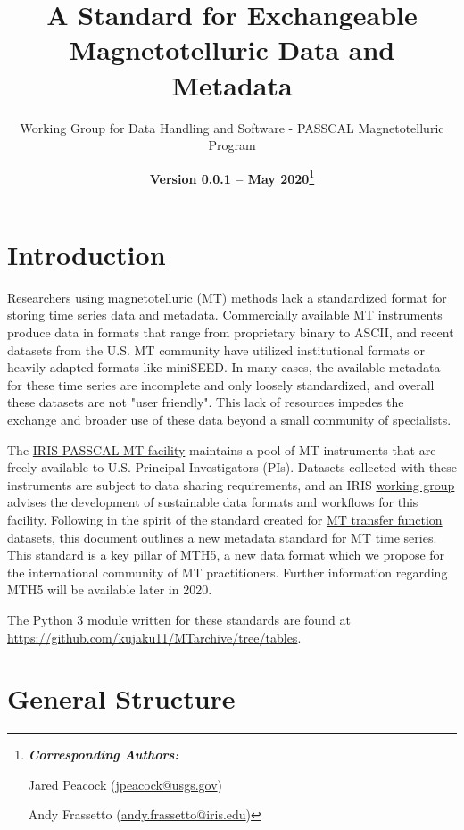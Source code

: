 \documentclass{article}
\title{A Standard for Exchangeable Magnetotelluric Data and Metadata}
\date{\textbf{Version 0.0.1 -- May 2020}\footnote{\noindent\textbf{\textit{Corresponding Authors:}}
		
		Jared Peacock (\url{jpeacock@usgs.gov})
		
		Andy Frassetto (\url{andy.frassetto@iris.edu})}}
\author[1]{Working Group for Data Handling and Software - PASSCAL Magnetotelluric Program}
\affil[1]{Portable Array Seismic Studies of the Continental Lithosphere, Incorporated Research Institutions for Seismology}
\begin{document}
	
\maketitle

\tableofcontents
\vspace{1cm}



%
%
\newpage

\section{Introduction}

Researchers using magnetotelluric (MT) methods lack a standardized format for storing time series data and metadata. Commercially available MT instruments produce data in formats that range from proprietary binary to ASCII, and recent datasets from the U.S. MT community have utilized institutional formats or heavily adapted formats like miniSEED. In many cases, the available metadata for these time series are incomplete and only loosely standardized, and overall these datasets are not "user friendly". This lack of resources impedes the exchange and broader use of these data beyond a small community of specialists.

The \href{https://www.iris.edu/hq/programs/passcal/magnetotelluric_instrumentation}{IRIS PASSCAL MT facility} maintains a pool of MT instruments that are freely available to U.S. Principal Investigators (PIs). Datasets collected with these instruments are subject to data sharing requirements, and an IRIS \href{https://www.iris.edu/hq/about_iris/governance/mt_soft}{working group} advises the development of sustainable data formats and workflows for this facility. Following in the spirit of the standard created for \href{https://library.seg.org/doi/10.1190/geo2018-0679.1}{MT transfer function} datasets, this document outlines a new metadata standard for MT time series. This standard is a key pillar of MTH5, a new data format which we propose for the international community of MT practitioners. Further information regarding MTH5 will be available later in 2020.

The Python 3 module written for these standards are found at \url{https://github.com/kujaku11/MTarchive/tree/tables}.

\section{General Structure}
\end{document}
